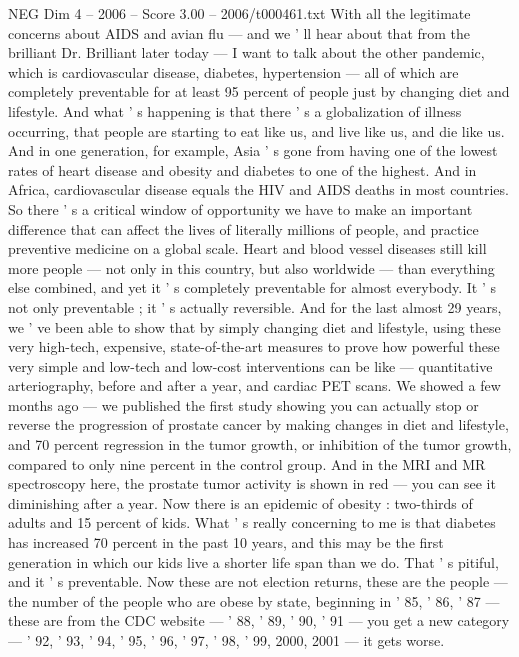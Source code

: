 \begin{textsample}{NEG Dim 4 – 2006 – Score 3.00 – 2006/t000461.txt}  \label{ex:f4_neg_077}
With all the legitimate concerns about AIDS and avian flu — and we ' ll hear about that from the brilliant Dr.
Brilliant later today — I want to talk about the other pandemic, which is cardiovascular disease, diabetes, hypertension — all of which are completely preventable for at least 95 percent of people just by changing diet and lifestyle.
And what ' s happening is that there ' s a globalization of illness occurring, that people are starting to eat like us, and live like us, and die like us.
And in one generation, for example, Asia ' s gone from having one of the lowest rates of heart disease and obesity and diabetes to one of the highest.
And in Africa, cardiovascular disease equals the HIV and AIDS deaths in most countries.
So there ' s a critical window of opportunity we have to make an important difference that can affect the lives of literally millions of people, and practice preventive medicine on a global scale.
Heart and blood vessel diseases still kill more people — not only in this country, but also worldwide — than everything else combined, and yet it ' s completely preventable for almost everybody.
It ' s not only preventable ; it ' s actually reversible.
And for the last almost 29 years, we ' ve been able to show that by simply changing diet and lifestyle, using these very high-tech, expensive, state-of-the-art measures to prove how powerful these very simple and low-tech and low-cost interventions can be like — quantitative arteriography, before and after a year, and cardiac PET scans.
We showed a few months ago — we published the first study showing you can actually stop or reverse the progression of prostate cancer by making changes in diet and lifestyle, and 70 percent regression in the tumor growth, or inhibition of the tumor growth, compared to only nine percent in the control group.
And in the MRI and MR spectroscopy here, the prostate tumor activity is shown in red — you can see it diminishing after a year.
Now there is an epidemic of obesity : two-thirds of adults and 15 percent of kids.
What ' s really concerning to me is that diabetes has increased 70 percent in the past 10 years, and this may be the first generation in which our kids live a shorter life span than we do.
That ' s pitiful, and it ' s preventable.
Now these are not election returns, these are the people — the number of the people who are obese by state, beginning in ' 85, ' 86, ' 87 — these are from the CDC website — ' 88, ' 89, ' 90, ' 91 — you get a new category — ' 92, ' 93, ' 94, ' 95, ' 96, ' 97, ' 98, ' 99, 2000, 2001 — it gets worse.

\end{textsample}
